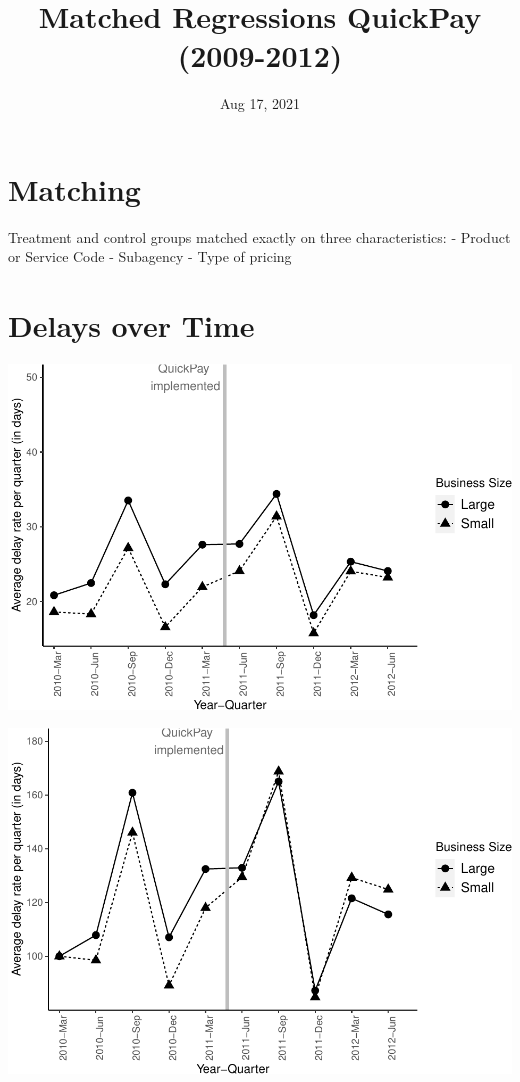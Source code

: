 \documentclass[]{article}
\title{Matched Regressions QuickPay (2009-2012)}
\author{}
\date{\vspace{-2.5em}Aug 17, 2021}
\begin{document}
\maketitle

\hypertarget{matching}{%
\section{Matching}\label{matching}}

Treatment and control groups matched exactly on three characteristics: -
Product or Service Code - Subagency - Type of pricing

\hypertarget{delays-over-time}{%
\section{Delays over Time}\label{delays-over-time}}

\includegraphics{qp_first_matched_files/figure-latex/plot-1.pdf}

\includegraphics{qp_first_matched_files/figure-latex/normalized_plot-1.pdf}
\end{document}
